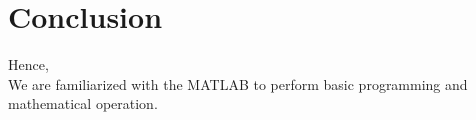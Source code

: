 \documentclass[12pt]{article}
\begin{document}
\pagebreak

\section{Conclusion}
Hence, \\
We are familiarized with the MATLAB to perform basic programming and mathematical operation.
\newpage
%
%
\end{document}
